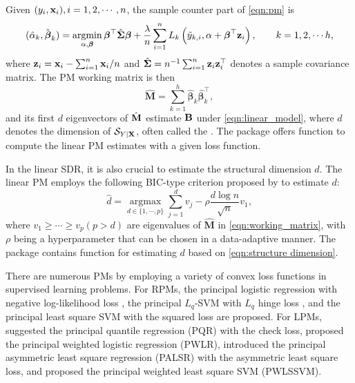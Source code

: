 Given $(y_i, \mathbf{x}_i), i = 1, 2, \cdots, n$, the sample counter part of \eqref{eqn:pm} is
\begin{equation}
\label{eqn:sample_model}
(\hat \alpha_k, \hat {\boldsymbol{\beta}}_k) = \mathop{\rm argmin}_{\alpha, \boldsymbol{\beta}} \boldsymbol{\beta}^{\top} \hat {\boldsymbol{\Sigma}} \boldsymbol{\beta} + \frac{\lambda}{n} \sum_{i=1}^{n}  L_k\left(\tilde y_{k,i}, \alpha + \boldsymbol{\beta}^\top \mathbf{z}_i \right), \qquad k = 1, 2, \cdots h,
\end{equation}
where $\mathbf{z}_i = \mathbf{x}_i - \sum_{i=1}^{n} \mathbf{x}_i/n$ and $\hat {\boldsymbol{\Sigma}} = n^{-1}\sum_{i=1}^{n} \mathbf{z}_i \mathbf{z}_i^\top$ denotes a sample covariance matrix. The PM working matrix is then 
\begin{equation} \label{eqn:working_matrix}
\hat{\mathbf{M}} = \sum_{k=1}^h \hat{\boldsymbol{\beta}}_{k} \hat{\boldsymbol{\beta}}_{k}^{\top},
\end{equation}
and its first $d$ eigenvectors of $\hat {\mathbf{M}}$ estimate $\mathbf{B}$ under \eqref{eqn:linear_model}, where $d$ denotes the dimension of $\mathcal{S}_{Y\mid \mathbf{X}}$, often called the .
The  package offers  function to compute the linear PM estimates with a given loss function. 

In the linear SDR, it is also crucial to estimate the structural dimension  $d$. The linear PM employs the following BIC-type criterion proposed by \citet{Li2011::psvm} to estimate $d$:
\begin{equation}\label{eqn:structure dimension}
\hat{d}=\underset{d \in\{1, \cdots, p\}}{\operatorname{argmax}} \sum_{j=1}^{d} v_{j}-\rho \frac{d \log n}{\sqrt{n}} v_{1},
\end{equation}
where $v_{1} \geq \cdots \geq v_{p} (p > d)$ are eigenvalues of $\hat{\mathbf{M}}$ in \eqref{eqn:working_matrix}, with $\rho$ being a hyperparameter that can be chosen in a data-adaptive manner. The  package contains  function for estimating $d$ based on \eqref{eqn:structure dimension}.

There are numerous PMs by employing a variety of convex loss functions in supervised learning problems. 
For RPMs, the principal logistic regression with negative log-likelihood loss \citep[PLR,][]{shin2017penalized}, the principal $L_q$-SVM with $L_q$ hinge loss \citep[$L_q$-PSVM,][]{artemiou2016sufficient}, and the principal least square SVM with the squared loss \citep[PLSSVM,][]{artemiou2021real} are proposed.
For LPMs, \citet{wang2018principal} suggested the principal quantile regression (PQR) with the check loss, \citet{kim2019principal} proposed the principal weighted logistic regression (PWLR), \citet{soale2022sufficient} introduced the principal asymmetric least square regression (PALSR) with the asymmetric least square loss, and \citet{jang2023principal} proposed the principal weighted least square SVM (PWLSSVM).

